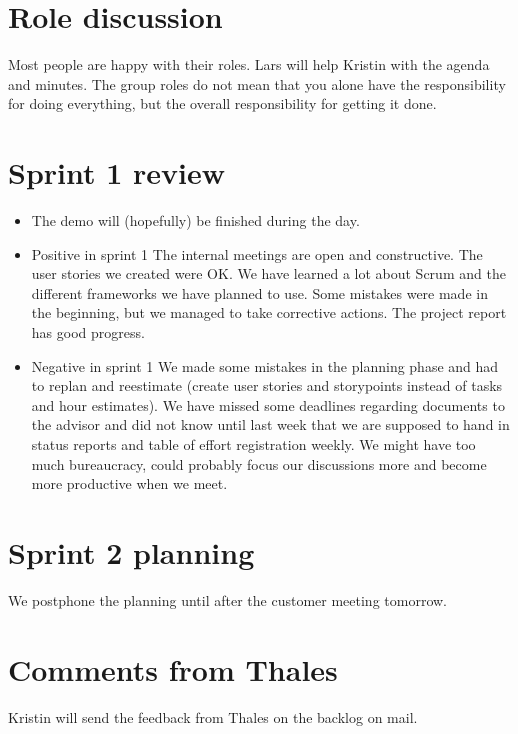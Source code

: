 \documentclass[a4paper,12pt]{article}
\begin{document}
\section{Role discussion}
Most people are happy with their roles. Lars will help Kristin with the agenda and minutes.
The group roles do not mean that you alone have the responsibility for doing everything, but the overall responsibility for getting it done.
\section{Sprint 1 review}
\begin{itemize}
\item
The demo will (hopefully) be finished during the day.
\item
Positive in sprint 1
\subitem
The internal meetings are open and constructive.
\subitem
The user stories we created were OK.
\subitem
We have learned a lot about Scrum and the different frameworks we have planned to use. Some mistakes were made in the 
beginning, but we managed to take corrective actions.
\subitem
The project report has good progress.
\item
Negative in sprint 1
\subitem
We made some mistakes in the planning phase and had to replan and reestimate (create user stories and storypoints instead of
tasks and hour estimates).
\subitem
We have missed some deadlines regarding documents to the advisor and did not know until last week that
we are supposed to hand in status reports and table of effort registration weekly. 
\subitem
We might have too much bureaucracy, could probably focus our discussions more and become more productive when we meet.
\end{itemize}
\section{Sprint 2 planning}
We postphone the planning until after the customer meeting tomorrow. 
\section{Comments from Thales}
Kristin will send the feedback from Thales on the backlog on mail.
\end{document}
